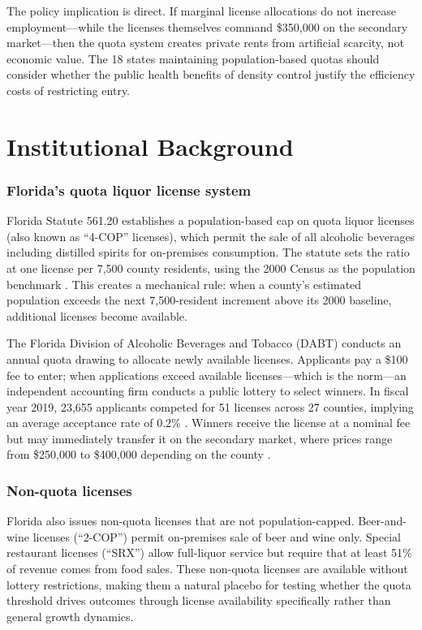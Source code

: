\documentclass[12pt]{article}
\begin{document}
The policy implication is direct. If marginal license allocations do not increase employment---while the licenses themselves command \$350,000 on the secondary market---then the quota system creates private rents from artificial scarcity, not economic value. The 18 states maintaining population-based quotas should consider whether the public health benefits of density control justify the efficiency costs of restricting entry.

\section{Institutional Background}

\subsubsection*{Florida's quota liquor license system} Florida Statute 561.20 establishes a population-based cap on quota liquor licenses (also known as ``4-COP'' licenses), which permit the sale of all alcoholic beverages including distilled spirits for on-premises consumption. The statute sets the ratio at one license per 7,500 county residents, using the 2000 Census as the population benchmark \citep{florida_statute_561}. This creates a mechanical rule: when a county's estimated population exceeds the next 7,500-resident increment above its 2000 baseline, additional licenses become available.

The Florida Division of Alcoholic Beverages and Tobacco (DABT) conducts an annual quota drawing to allocate newly available licenses. Applicants pay a \$100 fee to enter; when applications exceed available licenses---which is the norm---an independent accounting firm conducts a public lottery to select winners. In fiscal year 2019, 23,655 applicants competed for 51 licenses across 27 counties, implying an average acceptance rate of 0.2\% \citep{florida_dbpr_2023}. Winners receive the license at a nominal fee but may immediately transfer it on the secondary market, where prices range from \$250,000 to \$400,000 depending on the county \citep{florida_license_market}.

\subsubsection*{Non-quota licenses} Florida also issues non-quota licenses that are not population-capped. Beer-and-wine licenses (``2-COP'') permit on-premises sale of beer and wine only. Special restaurant licenses (``SRX'') allow full-liquor service but require that at least 51\% of revenue comes from food sales. These non-quota licenses are available without lottery restrictions, making them a natural placebo for testing whether the quota threshold drives outcomes through license availability specifically rather than general growth dynamics.
\end{document}
